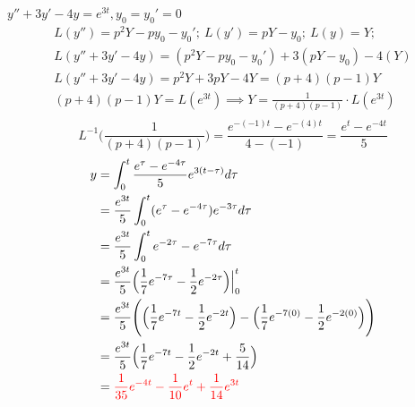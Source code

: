 \item[15.] $y'' + 3y'- 4y= e^{3t}, y_0 = y_0' = 0$
\begin{gather*}
    L(y'')=p^2Y-py_0-y_0';\:
    L(y')=pY-y_0;\:
    L(y)=Y;\:\\
    L(y'' + 3y'- 4y)=(p^2Y-py_0-y_0')+3(pY-y_0)-4(Y)\\
    L(y'' + 3y'- 4y)=p^2Y+3pY-4Y=(p+4)(p-1)Y\\
    (p+4)(p-1)Y=L(e^{3t}) \implies Y=\frac{1}{(p+4)(p-1)}\cdot L(e^{3t})\\
\end{gather*}
\begin{equation*}
    L^{-1}\Bigg(\frac{1}{(p+4)(p-1)} \Bigg) 
    = \frac{e^{-(-1)t}-e^{-(4)t}}{4-(-1)}=\frac{e^{t}-e^{-4t}}{5}
    \tag{By \( L7 \)}
\end{equation*}
\begin{align*}
    y 
    & = \int^t_0 \frac{e^{\tau}-e^{-4\tau}}{5}e^{3(t-\tau)}d\tau\\
    & = \frac{e^{3t}}{5}\int^t_0 (e^{\tau}-e^{-4\tau})e^{-3\tau}d\tau\\
    & = \frac{e^{3t}}{5}\int^t_0 e^{-2\tau}-e^{-7\tau}d\tau\\
    & = \frac{e^{3t}}{5}\Big( \frac{1}{7}e^{-7\tau}-\frac{1}{2}e^{-2\tau}\Big)\Big|^t_0\\
    & = \frac{e^{3t}}{5}
    \Bigg(
    \Big( \frac{1}{7}e^{-7t}-\frac{1}{2}e^{-2t}\Big)
    -\Big( \frac{1}{7}e^{-7(0)}-\frac{1}{2}e^{-2(0)}\Big)
    \Bigg)\\
    & = \frac{e^{3t}}{5}
    \Big(\frac{1}{7}e^{-7t}-\frac{1}{2}e^{-2t} + \frac{5}{14}\Big)\\
    & = \textcolor{red}{\frac{1}{35}e^{-4t}-\frac{1}{10}e^{t} + \frac{1}{14}e^{3t}}
\end{align*}
